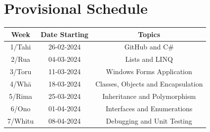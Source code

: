 \documentclass{article}
\begin{document}
\section*{Provisional Schedule}
\renewcommand{\arraystretch}{1.5}
\begin{tabular}{|c|c|c|c|}
	\hline
	\textbf{Week}                  & \textbf{Date Starting}            & \multicolumn{2}{c|}{\textbf{Topics}}                                                                                             \\ \hline
	\footnotesize 1/Tahi           & \footnotesize 26-02-2024 & \multicolumn{2}{c|}{\footnotesize GitHub and C\#}    \\ \hline
	\footnotesize 2/Rua            & \footnotesize 04-03-2024 & \multicolumn{2}{c|}{\footnotesize Lists and LINQ}                   \\ \hline
	\footnotesize 3/Toru           & \footnotesize 11-03-2024 & \multicolumn{2}{c|}{\footnotesize Windows Forms Application} \\ \hline
	\footnotesize 4/Whā            & \footnotesize 18-03-2024 & \multicolumn{2}{c|}{\footnotesize Classes, Objects and Encapsulation}                               \\ \hline
	\footnotesize 5/Rima           & \footnotesize 25-03-2024 & \multicolumn{2}{c|}{\footnotesize Inheritance and Polymorphism}                                                \\ \hline
	\footnotesize 6/Ono            & \footnotesize 01-04-2024  & \multicolumn{2}{c|}{\footnotesize Interfaces and Enumerations}                                                   \\ \hline
	\footnotesize 7/Whitu          & \footnotesize 08-04-2024 &  \multicolumn{2}{c|}{\footnotesize Debugging and Unit Testing}                            \\ \hline


\end{tabular}
\end{document}

